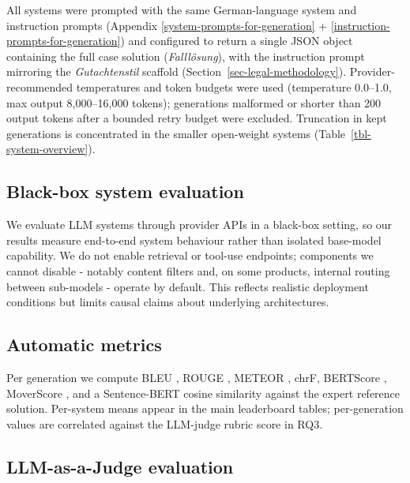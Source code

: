 \documentclass[11pt]{article}
\begin{document}
All systems were prompted with the same German-language system and
instruction prompts (Appendix \ref{system-prompts-for-generation} +
\ref{instruction-prompts-for-generation}) and configured to return a
single JSON object containing the full case solution
(\emph{Falllösung}), with the instruction prompt mirroring the
\emph{Gutachtenstil} scaffold (Section~\ref{sec-legal-methodology}).
Provider-recommended temperatures and token budgets were used
(temperature 0.0--1.0, max output 8,000--16,000 tokens); generations
malformed or shorter than 200 output tokens after a bounded retry budget
were excluded. Truncation in kept generations is concentrated in the
smaller open-weight systems (Table~\ref{tbl-system-overview}).

\subsection{Black-box system
evaluation}\label{black-box-system-evaluation}

We evaluate LLM systems through provider APIs in a black-box setting, so
our results measure end-to-end system behaviour rather than isolated
base-model capability. We do not enable retrieval or tool-use endpoints;
components we cannot disable - notably content filters and, on some
products, internal routing between sub-models - operate by default. This
reflects realistic deployment conditions but limits causal claims about
underlying architectures.

\subsection{Automatic metrics}\label{automatic-metrics}

Per generation we compute BLEU \citep{papineni2002bleu}, ROUGE
\citep{lin2004rouge}, METEOR \citep{banerjee2005meteor}, chrF, BERTScore
\citep{zhang2020bertscore}, MoverScore \citep{zhao2019moverscore}, and a
Sentence-BERT cosine similarity \citep{reimers2019sentencebert} against
the expert reference solution. Per-system means appear in the main
leaderboard tables; per-generation values are correlated against the
LLM-judge rubric score in RQ3.

\subsection{LLM-as-a-Judge evaluation}\label{llm-as-a-judge-evaluation}
\end{document}
